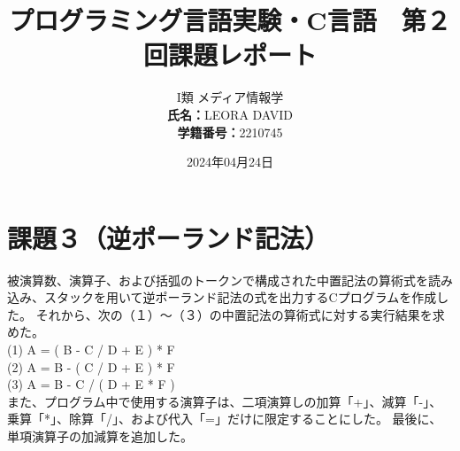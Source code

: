 \documentclass[]{jsarticle}
\title{\vspace{-3cm} プログラミング言語実験・C言語　第２回課題レポート}
\author{I類 メディア情報学 \\\textbf{氏名：}LEORA DAVID\\\textbf{学籍番号：}2210745}
\date{2024年04月24日}
\begin{document}
\maketitle
\section*{課題３（逆ポーランド記法）}
被演算数、演算子、および括弧のトークンで構成された中置記法の算術式を読み込み、スタックを用いて逆ポーランド記法の式を出力するCプログラムを作成した。
それから、次の（１）〜（３）の中置記法の算術式に対する実行結果を求めた。\\
\hspace*{1cm}(1) A = ( B - C / D + E ) * F\\
\hspace*{1cm}(2) A = B - ( C / D + E ) * F\\
\hspace*{1cm}(3) A = B - C / ( D + E * F )\\
また、プログラム中で使用する演算子は、二項演算しの加算「+」、減算「-」、乗算「*」、除算「/」、および代入「=」だけに限定することにした。
最後に、単項演算子の加減算を追加した。\\
\end{document}
